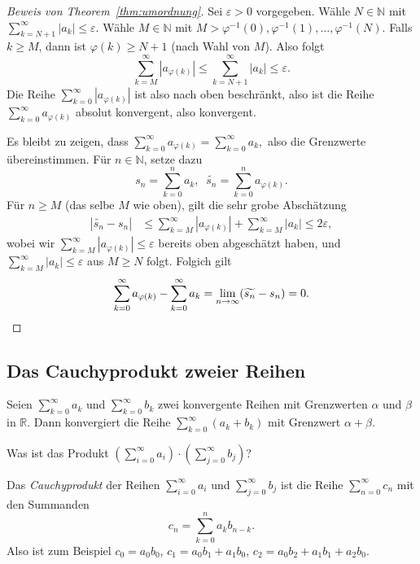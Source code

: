\documentclass[../main.tex]{subfiles}
\begin{document}
\begin{proof}[Beweis von Theorem~\ref{thm:umordnung}]
  Sei $\varepsilon > 0$ 
  vorgegeben.
  Wähle $N \in \mathbb{N}$ 
  mit $\sum_{k=N+1}^{\infty} |a_k| \leq \varepsilon$.
  Wähle $M \in \mathbb{N}$ mit $M > \varphi^{-1}(0),
  \varphi^{-1}(1), \dots, \varphi^{-1}(N)$.
  Falls $k \geq M$, dann ist $\varphi(k) \geq N+1$
  (nach Wahl von $M$).
  Also folgt
  \[
   \sum_{k=M}^{\infty} |a_{\varphi(k)}| 
   \leq \sum_{k=N+1}^{\infty} |a_k| \leq \varepsilon.
  \]
  Die Reihe
  $\sum_{k=0}^{\infty} |a_{\varphi(k)}|$ ist also
  nach oben beschränkt,
  also ist die Reihe
  $\sum_{k=0}^{\infty} a_{\varphi(k)}$ absolut konvergent,
  also konvergent.

  Es bleibt zu zeigen, dass
  \(
    \sum_{k=0}^{\infty} a_{\varphi(k)} = \sum_{k=0}^{\infty} a_k,
  \)
  also die Grenzwerte übereinstimmen.
  Für $n \in \mathbb{N}$, setze dazu
  \[
    s_n = \sum_{k=0}^{n} a_k, \;\; \widetilde{s_n} =
    \sum_{k=0}^{n} a_{\varphi(k)}.
  \]
  Für $n \geq M$ (das selbe $M$ wie oben),
  gilt die sehr grobe Abschätzung
  \begin{align*}
    |\widetilde{s_n} - s_n| & \leq
    \sum_{k=M}^{\infty} |a_{\varphi(k)}|
    + \sum_{k=M}^{\infty} |a_k| \leq 2\varepsilon,
  \end{align*}
  wobei wir
  $\sum_{k=M}^{\infty} |a_{\varphi(k)}| \leq \varepsilon$ 
  bereits oben abgeschätzt haben,
  und $\sum_{k=M}^{\infty} |a_k| \leq \varepsilon$ aus
  $M \geq N$ folgt.
  Folgich gilt
  \[
    \sum_{k=0}^{\infty} a_{\varphi(k)}
    - \sum_{k=0}^{\infty} a_{k} =
    \lim_{n \to \infty}(\widetilde{s_n} - s_n) = 0. \qedhere
  \]
\end{proof}

\subsection*{Das Cauchyprodukt zweier Reihen}
Seien $\sum_{k=0}^{\infty} a_k$ und $\sum_{k=0}^{\infty} b_k$ 
zwei konvergente Reihen mit Grenzwerten
$\alpha$ und $\beta$ in $\mathbb{R}$.
Dann konvergiert die Reihe
$\sum_{k=0}^{\infty} (a_k + b_k)$ mit Grenzwert
$\alpha + \beta$.

\begin{question}
  Was ist das Produkt $\left( \sum_{i=0}^{\infty} a_i \right)
  \cdot \left( \sum_{j=0}^{\infty} b_j \right)$?
\end{question}

\begin{definition}
  Das \emph{Cauchyprodukt} der Reihen
  $\sum_{i=0}^{\infty} a_i$ und $\sum_{j=0}^{\infty} b_j$ 
  ist die Reihe $\sum_{n=0}^{\infty} c_n$ mit den Summanden
  \[
    c_n = \sum_{k=0}^{n} a_k b_{n-k}.
  \]
  Also ist zum Beispiel
    $c_0 = a_0 b_0$,
    $c_1 = a_0 b_1 + a_1 b_0$,
    $c_2 = a_0 b_2 + a_1 b_1 + a_2 b_0$.
\end{definition}
\end{document}
